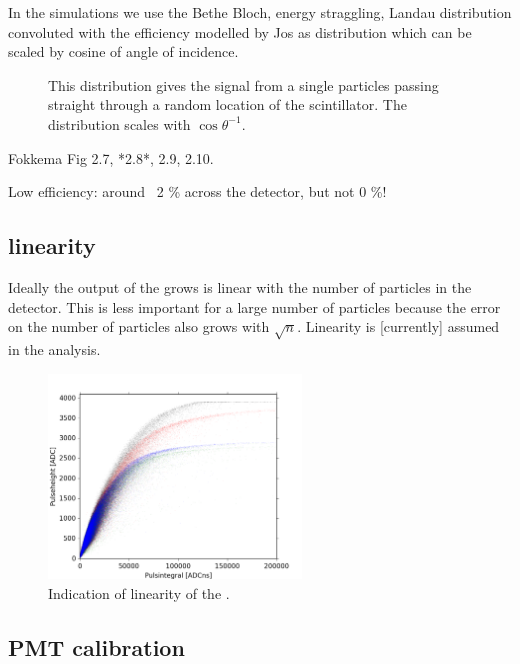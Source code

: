 In the simulations we use the Bethe Bloch, energy straggling, Landau
distribution convoluted with the efficiency modelled by Jos as
distribution which can be scaled by cosine of angle of incidence.

\begin{figure}
    \centering
    
    \caption{ This distribution gives
             the signal from a single particles passing straight through
             a random location of the scintillator. The distribution
             scales with $\cos{\theta}^{-1}$.}
    \label{fig:signal_efficiency}
\end{figure}

Fokkema Fig 2.7, *2.8*, 2.9, 2.10.

Low efficiency: around ~2 \% across the detector, but not 0 \%!



\subsection{\pmt linearity}

Ideally the output of the \pmt grows is linear with the number of
particles in the detector. This is less important for a large number of
particles because the error on the number of particles also grows with
$\sqrt{n}$. Linearity is [currently] assumed in the analysis.

\begin{figure}
    \centering
    \includegraphics[width=0.6\textwidth]{plots/response/ph_vs_pi.png}
    \caption{
             Indication of linearity of the \pmt.}
    \label{fig:transport_time}
\end{figure}


\subsection{PMT calibration}
\label{sub:pmt_calibration}

